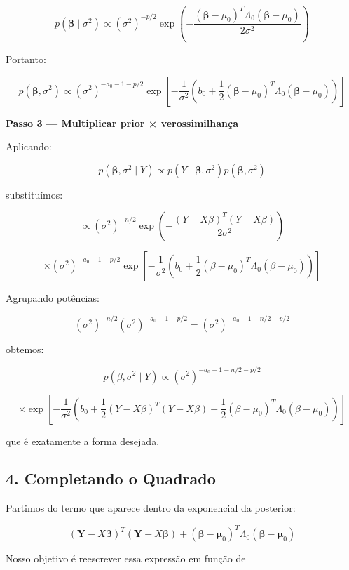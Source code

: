 \documentclass[12pt, a4paper]{article}
\begin{document}
\[
p(\boldsymbol\beta\mid\sigma^2)
\propto
(\sigma^2)^{-p/2}
\exp
\left(
-
\frac{
(\boldsymbol\beta-\mu_0)^T
\Lambda_0
(\boldsymbol\beta-\mu_0)
}{
2\sigma^2
}
\right)
\]

Portanto:

\[
p(\boldsymbol\beta,\sigma^2)
\propto
(\sigma^2)^{-a_0-1-p/2}
\exp
\left[
-
\frac1{\sigma^2}
\left(
b_0+
\frac12
(\boldsymbol\beta-\mu_0)^T
\Lambda_0
(\boldsymbol\beta-\mu_0)
\right)
\right]
\]

\vspace{0.3cm}

\textbf{Passo 3 — Multiplicar prior × verossimilhança}

Aplicando:

\[
p(\boldsymbol\beta,\sigma^2\mid Y)
\propto
p(Y\mid\boldsymbol\beta,\sigma^2)
p(\boldsymbol\beta,\sigma^2)
\]

substituímos:

\[
\propto
(\sigma^2)^{-n/2}
\exp
\left(
-
\frac{
(Y-X\beta)^T(Y-X\beta)
}{
2\sigma^2
}
\right)
\]

\[
\times
(\sigma^2)^{-a_0-1-p/2}
\exp
\left[
-
\frac1{\sigma^2}
\left(
b_0+
\frac12
(\beta-\mu_0)^T
\Lambda_0
(\beta-\mu_0)
\right)
\right]
\]

Agrupando potências:

\[
(\sigma^2)^{-n/2}
(\sigma^2)^{-a_0-1-p/2}
=
(\sigma^2)^{-a_0-1-n/2-p/2}
\]

obtemos:

\[
p(\beta,\sigma^2\mid Y)
\propto
(\sigma^2)^{-a_0-1-n/2-p/2}
\]

\[
\times
\exp
\left[
-
\frac1{\sigma^2}
\left(
b_0
+
\frac12
(Y-X\beta)^T(Y-X\beta)
+
\frac12
(\beta-\mu_0)^T
\Lambda_0
(\beta-\mu_0)
\right)
\right]
\]

que é exatamente a forma desejada.

\vspace{0.4cm}

\subsection*{4. Completando o Quadrado}

Partimos do termo que aparece dentro da exponencial da posterior:

\[
(\mathbf Y-X\boldsymbol\beta)^T
(\mathbf Y-X\boldsymbol\beta)
+
(\boldsymbol\beta-\boldsymbol\mu_0)^T
\Lambda_0
(\boldsymbol\beta-\boldsymbol\mu_0)
\]

Nosso objetivo é reescrever essa expressão em função de
\end{document}
